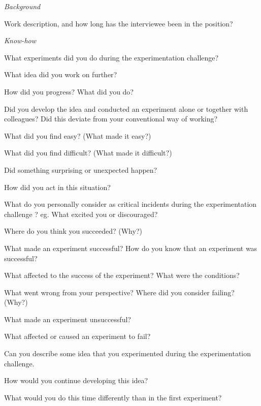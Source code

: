 \noindent\emph{Background}
\vspace{-3mm} 
\begin{list}{*}{}
\setlength{\itemsep}{-3pt}
 \item Work description, and how long has the interviewee been in the position?
\end{list}

\noindent \emph{Know-how}
\vspace{-3mm} 
\begin{list}{*}{}
\setlength{\itemsep}{-3pt}
 \item What experiments did you do during the experimentation challenge?
 \item What idea did you work on further?
 \item How did you progress? What did you do?
 \item Did you develop the idea and conducted an experiment alone or together with colleagues? Did this deviate from your conventional way of working? 
\newline
 \item What did you find easy? (What made it easy?)
 \item What did you find difficult? (What made it difficult?)
 \item Did something surprising or unexpected happen?
 \item How did you act in this situation?
 \item What do you personally consider as critical incidents during the experimentation challenge ? eg. What excited you or discouraged?
 \item Where do you think you succeeded? (Why?)
 \item What made an experiment successful? How do you know that an experiment was successful?
 \item What affected to the success of the experiment? What were the conditions?
 \item What went wrong from your perspective? Where did you consider failing? (Why?) 
 \item What made an experiment unsuccessful? 
 \item What affected or caused an experiment to fail? 
 \item Can you describe some idea that you experimented during the experimentation challenge. 
 \item How would you continue developing this idea?
 \item What would you do this time differently than in the first experiment?
 
\end{list}

